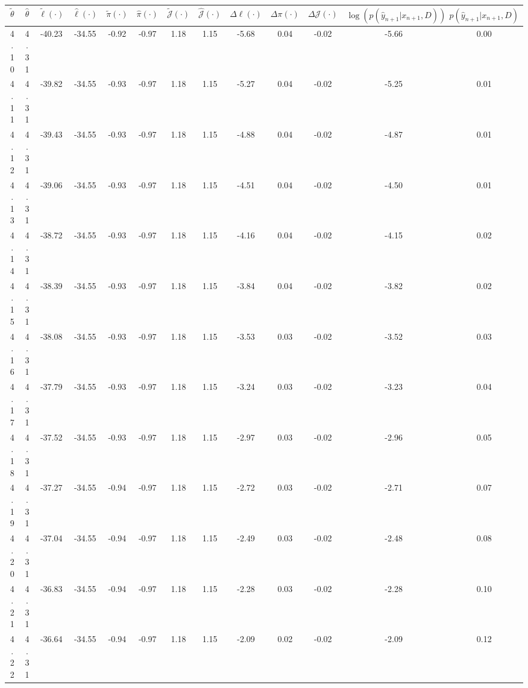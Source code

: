 \begin{table}[htbp]
        \centering
        \tiny
        \begin{adjustbox}{angle=90}
            \begin{tabular}{|c|c|c|c|c|c|c|c|c|c|c|c|c|}
                \hline
                 $\tilde{\theta}$ & $\hat{\theta}$ & $\tilde{\ell}(\cdot)$ & $\hat{\ell}(\cdot)$ & $\tilde{\pi}(\cdot)$ & $\hat{\pi}(\cdot)$ & $\tilde{\mathcal{J}}(\cdot)$ & $\hat{\mathcal{J}}(\cdot)$ & $\Delta \ell(\cdot)$ & $\Delta \pi(\cdot)$ & $\Delta \mathcal{J}(\cdot)$ & $\log(p(\hat{y}_{n+1}|x_{n+1}, D))$ & $p(\hat{y}_{n+1}|x_{n+1}, D)$ \\
                \hline
                 4.10 & 4.31 & -40.23 & -34.55 & -0.92 & -0.97 & 1.18 & 1.15 & -5.68 & 0.04 & -0.02 & -5.66 & 0.00\\ \hline
 4.11 & 4.31 & -39.82 & -34.55 & -0.93 & -0.97 & 1.18 & 1.15 & -5.27 & 0.04 & -0.02 & -5.25 & 0.01\\ \hline
 4.12 & 4.31 & -39.43 & -34.55 & -0.93 & -0.97 & 1.18 & 1.15 & -4.88 & 0.04 & -0.02 & -4.87 & 0.01\\ \hline
 4.13 & 4.31 & -39.06 & -34.55 & -0.93 & -0.97 & 1.18 & 1.15 & -4.51 & 0.04 & -0.02 & -4.50 & 0.01\\ \hline
 4.14 & 4.31 & -38.72 & -34.55 & -0.93 & -0.97 & 1.18 & 1.15 & -4.16 & 0.04 & -0.02 & -4.15 & 0.02\\ \hline
 4.15 & 4.31 & -38.39 & -34.55 & -0.93 & -0.97 & 1.18 & 1.15 & -3.84 & 0.04 & -0.02 & -3.82 & 0.02\\ \hline
 4.16 & 4.31 & -38.08 & -34.55 & -0.93 & -0.97 & 1.18 & 1.15 & -3.53 & 0.03 & -0.02 & -3.52 & 0.03\\ \hline
 4.17 & 4.31 & -37.79 & -34.55 & -0.93 & -0.97 & 1.18 & 1.15 & -3.24 & 0.03 & -0.02 & -3.23 & 0.04\\ \hline
 4.18 & 4.31 & -37.52 & -34.55 & -0.93 & -0.97 & 1.18 & 1.15 & -2.97 & 0.03 & -0.02 & -2.96 & 0.05\\ \hline
 4.19 & 4.31 & -37.27 & -34.55 & -0.94 & -0.97 & 1.18 & 1.15 & -2.72 & 0.03 & -0.02 & -2.71 & 0.07\\ \hline
 4.20 & 4.31 & -37.04 & -34.55 & -0.94 & -0.97 & 1.18 & 1.15 & -2.49 & 0.03 & -0.02 & -2.48 & 0.08\\ \hline
 4.21 & 4.31 & -36.83 & -34.55 & -0.94 & -0.97 & 1.18 & 1.15 & -2.28 & 0.03 & -0.02 & -2.28 & 0.10\\ \hline
 4.22 & 4.31 & -36.64 & -34.55 & -0.94 & -0.97 & 1.18 & 1.15 & -2.09 & 0.02 & -0.02 & -2.09 & 0.12\\ \hline

\end{tabular}
\end{adjustbox}
\end{table}
